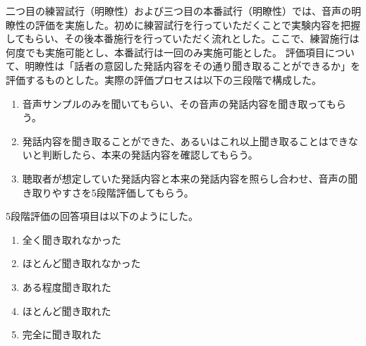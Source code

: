 \documentclass[12pt]{jarticle}
\numberwithin{equation}{section}    %
\numberwithin{figure}{section}      %
\numberwithin{table}{section}      %
\begin{document}
二つ目の練習試行（明瞭性）および三つ目の本番試行（明瞭性）では、音声の明瞭性の評価を実施した。初めに練習試行を行っていただくことで実験内容を把握してもらい、その後本番施行を行っていただく流れとした。ここで、練習施行は何度でも実施可能とし、本番試行は一回のみ実施可能とした。
評価項目について、明瞭性は「話者の意図した発話内容をその通り聞き取ることができるか」を評価するものとした。実際の評価プロセスは以下の三段階で構成した。
\begin{enumerate}
    \item 音声サンプルのみを聞いてもらい、その音声の発話内容を聞き取ってもらう。
    \item 発話内容を聞き取ることができた、あるいはこれ以上聞き取ることはできないと判断したら、本来の発話内容を確認してもらう。
    \item 聴取者が想定していた発話内容と本来の発話内容を照らし合わせ、音声の聞き取りやすさを5段階評価してもらう。
\end{enumerate}
5段階評価の回答項目は以下のようにした。
\begin{enumerate}
    \item 全く聞き取れなかった
    \item ほとんど聞き取れなかった
    \item ある程度聞き取れた
    \item ほとんど聞き取れた
    \item 完全に聞き取れた
\end{enumerate}
\end{document}
